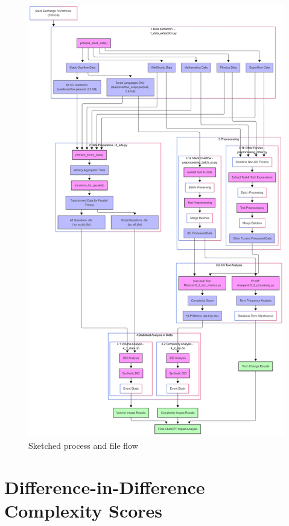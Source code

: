 \begin{figure}[H]
    \centering
    \includegraphics[width=0.8\linewidth]{imgs/process_flow.png}
    \caption{Sketched process and file flow}
    \label{fig:app-process_flow}
\end{figure}


\section{Difference-in-Difference Complexity Scores}\label{app:didcs}

